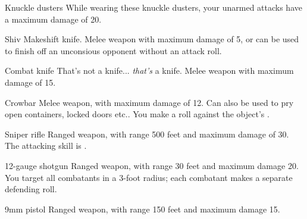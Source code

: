 
\begin{describe}{Knuckle dusters}
  While wearing these knuckle dusters, your unarmed attacks have a maximum damage of 20.
\end{describe}

\begin{describe}{Shiv}
  Makeshift knife. Melee weapon with maximum damage of 5, or can be used to finish off an unconsious opponent without an attack roll.
\end{describe}

\begin{describe}{Combat knife}
  That's not a knife... \emph{that's} a knife. Melee weapon with maximum damage of 15.
\end{describe}

\begin{describe}{Crowbar}
  Melee weapon, with maximum damage of 12. Can also be used to pry open containers, locked doors etc.. You make a  roll against the object's .
\end{describe}

\begin{describe}{Sniper rifle}
  Ranged weapon, with range 500 feet and maximum damage of 30. The attacking skill is .
\end{describe}

\begin{describe}{12-gauge shotgun}
  Ranged weapon, with range 30 feet and maximum damage 20. You target all combatants in a 3-foot radius; each combatant makes a separate defending roll.
\end{describe}

\begin{describe}{9mm pistol}
  Ranged weapon, with range 150 feet and maximum damage 15.
\end{describe}

